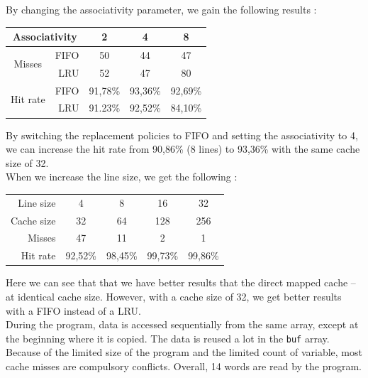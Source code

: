 \documentclass[a4paper]{report}
\begin{document}
By changing the associativity parameter, we gain the following results :

\begin{center}
	\begin{tabular}{|c|r||c|c|c|}
		\hline
		\multicolumn{2}{|c||}{Associativity} & 2 & 4 & 8 \\
		\hline
		\multirow{2}{*}{Misses}   & FIFO  & 50 & 44 & 47 \\
		                          & LRU   & 52 & 47 & 80 \\
		\multirow{2}{*}{Hit rate} & FIFO  & 91,78\% & 93,36\% & 92,69\% \\
		                          & LRU   & 91.23\% & 92,52\% & 84,10\% \\
		\hline
	\end{tabular}
\end{center}

By switching the replacement policies to FIFO and setting the associativity to 4, we can increase the hit
rate from 90,86\% (8 lines) to 93,36\% with the same cache size of 32.
\mbox{}\\

When we increase the line size, we get the following :

\begin{center}
	\begin{tabular}{|r||c|c|c|c|}
		\hline
		Line size  & 4       & 8       & 16      & 32      \\
		Cache size & 32      & 64      & 128     & 256     \\
		Misses     & 47      & 11      & 2       & 1       \\
		Hit rate   & 92,52\% & 98,45\% & 99,73\% & 99,86\% \\
		\hline
	\end{tabular}
\end{center}

Here we can see that that we have better results that the direct mapped cache -- at identical cache size.
However, with a cache size of 32, we get better results with a FIFO instead of a LRU.
\mbox{}\\

During the program, data is accessed sequentially from the same array, except at the beginning where it is
copied. The data is reused a lot in the \texttt{buf} array. Because of the limited size of the program and the
limited count of variable, most cache misses are compulsory conflicts. Overall, 14 words are read by the
program.
\mbox{}\\
\end{document}
